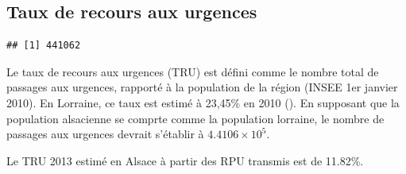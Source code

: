 \documentclass[12pt,english,french,twoside]{report}\usepackage[]{graphicx}\usepackage[]{color}
\makeatletter
\newenvironment{kframe}{%
 \def\at@end@of@kframe{}%
 \ifinner\ifhmode%
  \def\at@end@of@kframe{\end{minipage}}%
  \begin{minipage}{\columnwidth}%
 \fi\fi%
 \def\FrameCommand##1{\hskip\@totalleftmargin \hskip-\fboxsep
 \colorbox{shadecolor}{##1}\hskip-\fboxsep
     \hskip-\linewidth \hskip-\@totalleftmargin \hskip\columnwidth}%
 \MakeFramed {\advance\hsize-\width
   \@totalleftmargin\z@ \linewidth\hsize
   \@setminipage}}%
 {\par\unskip\endMakeFramed%
 \at@end@of@kframe}
\newenvironment{knitrout}{}{} %
\makeatother
\begin{document}
\subsection*{Taux de recours aux urgences}
\begin{knitrout}
\color{fgcolor}\begin{kframe}
\begin{verbatim}
## [1] 441062
\end{verbatim}
\end{kframe}
\end{knitrout}

Le taux de recours aux urgences  (TRU)  est défini comme le nombre total de passages aux urgences, rapporté à la population de la région (INSEE 1er janvier 2010). En Lorraine, ce taux est estimé à 23,45\% en 2010 (\cite{2,3}). En supposant que la population alsacienne se comprte comme la population lorraine, le nombre de passages aux urgences devrait s'établir à \ensuremath{4.4106\times 10^{5}}.

Le TRU 2013 estimé en Alsace à partir des RPU transmis est de 11.82\%.
\end{document}
